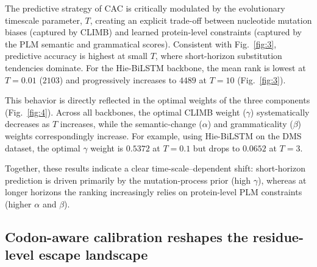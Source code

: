 \documentclass[pdflatex,sn-nature]{sn-jnl}
\begin{document}
The predictive strategy of CAC is critically modulated by the evolutionary timescale parameter, $T$, creating an explicit trade-off between nucleotide mutation biases (captured by CLIMB) and learned protein-level constraints (captured by the PLM semantic and grammatical scores). Consistent with Fig.~\ref{fig:3}, predictive accuracy is highest at small $T$, where short-horizon substitution tendencies dominate. For the Hie-BiLSTM backbone, the mean rank is lowest at $T=0.01$ ($2103$) and progressively increases to $4489$ at $T=10$ (Fig.~\ref{fig:3}).

This behavior is directly reflected in the optimal weights of the three components (Fig.~\ref{fig:4}). Across all backbones, the optimal CLIMB weight ($\gamma$) systematically decreases as $T$ increases, while the semantic-change ($\alpha$) and grammaticality ($\beta$) weights correspondingly increase. For example, using Hie-BiLSTM on the DMS dataset, the optimal $\gamma$ weight is $0.5372$ at $T=0.1$ but drops to $0.0652$ at $T=3$.

Together, these results indicate a clear time-scale--dependent shift: short-horizon prediction is driven primarily by the mutation-process prior (high $\gamma$), whereas at longer horizons the ranking increasingly relies on protein-level PLM constraints (higher $\alpha$ and $\beta$).


\subsection*{Codon-aware calibration reshapes the residue-level escape landscape}

\end{document}
